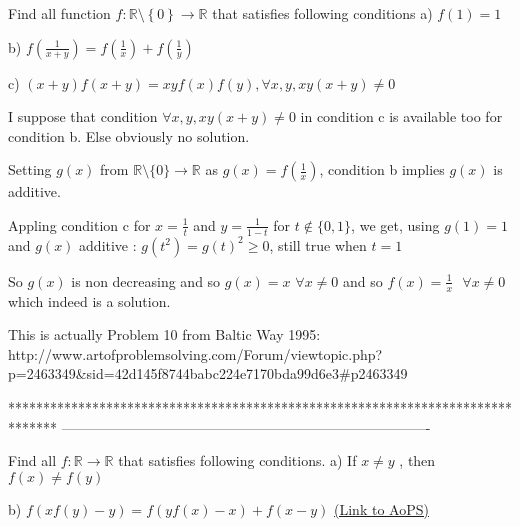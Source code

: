 \begin{solution}
	\begin{tcolorbox}Find all function $f :\mathbb{R}\setminus \left \{ 0 \right \}  \to \mathbb{R}$ that satisfies following conditions
a) $ f(1)=1$

b)  $f\left ( \frac{1}{x+y} \right )=f\left ( \frac{1}{x} \right )+f\left ( \frac{1}{y} \right )$

c)  $\left ( x+y \right )f(x+y)=xyf(x)f(y),\forall x,y,xy(x+y)\neq 0$\end{tcolorbox}
I suppose that condition $\forall x,y,xy(x+y)\ne 0$ in condition c is available too for condition b. Else obviously no solution.

Setting $g(x)$ from $\mathbb R\setminus\{0\}\to\mathbb R$ as $g(x)=f(\frac 1x)$, condition b implies $g(x)$ is additive.

Appling condition c for $x=\frac 1t$ and $y=\frac 1{1-t}$ for $t\notin\{0,1\}$, we get, using $g(1)=1$ and $g(x)$ additive :
$g(t^2)=g(t)^2\ge 0$, still true when $t=1$

So $g(x)$ is non decreasing and so $g(x)=x$ $\forall x\ne 0$ and so $\boxed{f(x)=\frac 1x\text{  }\forall x\ne 0}$ which indeed is a solution.
\end{solution}



\begin{solution}
	This is actually Problem 10 from Baltic Way 1995:
http://www.artofproblemsolving.com/Forum/viewtopic.php?p=2463349&sid=42d145f8744babc224e7170bda99d6e3#p2463349
\end{solution}
*******************************************************************************
-------------------------------------------------------------------------------

\begin{problem}
	Find all $ f: \mathbb{R}\rightarrow \mathbb{R} $   that satisfies following conditions.
a) If $x\neq y$ ,  then     $ f(x)\neq f(y)$

b) $f\left ( xf\left ( y \right ) -y\right )=f\left ( yf\left ( x \right )-x \right )+f(x-y)$
	\flushright \href{https://artofproblemsolving.com/community/c6h618324}{(Link to AoPS)}
\end{problem}



